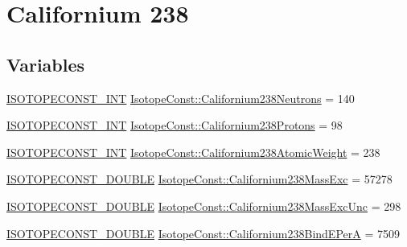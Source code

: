 \hypertarget{group___isotope_const-_californium-_cf238}{}\section{Californium 238}
\label{group___isotope_const-_californium-_cf238}
\subsection*{Variables}
\begin{DoxyCompactItemize}
\item 
\mbox{\hyperlink{group___isotope_const-_macros_ga5f18360b3e99483a35c32d789e62621c}{I\+S\+O\+T\+O\+P\+E\+C\+O\+N\+S\+T\+\_\+\+I\+NT}} \mbox{\hyperlink{group___isotope_const-_californium-_cf238_ga54028d8e4a4bf790a658836a61b95500}{Isotope\+Const\+::\+Californium238\+Neutrons}} = 140
\item 
\mbox{\hyperlink{group___isotope_const-_macros_ga5f18360b3e99483a35c32d789e62621c}{I\+S\+O\+T\+O\+P\+E\+C\+O\+N\+S\+T\+\_\+\+I\+NT}} \mbox{\hyperlink{group___isotope_const-_californium-_cf238_ga24e323ccd15d85ce38414f4d09714a07}{Isotope\+Const\+::\+Californium238\+Protons}} = 98
\item 
\mbox{\hyperlink{group___isotope_const-_macros_ga5f18360b3e99483a35c32d789e62621c}{I\+S\+O\+T\+O\+P\+E\+C\+O\+N\+S\+T\+\_\+\+I\+NT}} \mbox{\hyperlink{group___isotope_const-_californium-_cf238_ga8ca72f8b38003c1506bc19e695309b2b}{Isotope\+Const\+::\+Californium238\+Atomic\+Weight}} = 238
\item 
\mbox{\hyperlink{group___isotope_const-_macros_ga8f45a7272ce02c0b4c65c44636ed719a}{I\+S\+O\+T\+O\+P\+E\+C\+O\+N\+S\+T\+\_\+\+D\+O\+U\+B\+LE}} \mbox{\hyperlink{group___isotope_const-_californium-_cf238_gacb4cde21ecb7b6cfa87f2a3d672c09bf}{Isotope\+Const\+::\+Californium238\+Mass\+Exc}} = 57278
\item 
\mbox{\hyperlink{group___isotope_const-_macros_ga8f45a7272ce02c0b4c65c44636ed719a}{I\+S\+O\+T\+O\+P\+E\+C\+O\+N\+S\+T\+\_\+\+D\+O\+U\+B\+LE}} \mbox{\hyperlink{group___isotope_const-_californium-_cf238_ga934c13d55d59bbf8ba1aae07549bc104}{Isotope\+Const\+::\+Californium238\+Mass\+Exc\+Unc}} = 298
\item 
\mbox{\hyperlink{group___isotope_const-_macros_ga8f45a7272ce02c0b4c65c44636ed719a}{I\+S\+O\+T\+O\+P\+E\+C\+O\+N\+S\+T\+\_\+\+D\+O\+U\+B\+LE}} \mbox{\hyperlink{group___isotope_const-_californium-_cf238_ga66cc0bfb98bd025934ba9e500b21c2e6}{Isotope\+Const\+::\+Californium238\+Bind\+E\+PerA}} = 7509
\item 

\end{DoxyCompactItemize}
